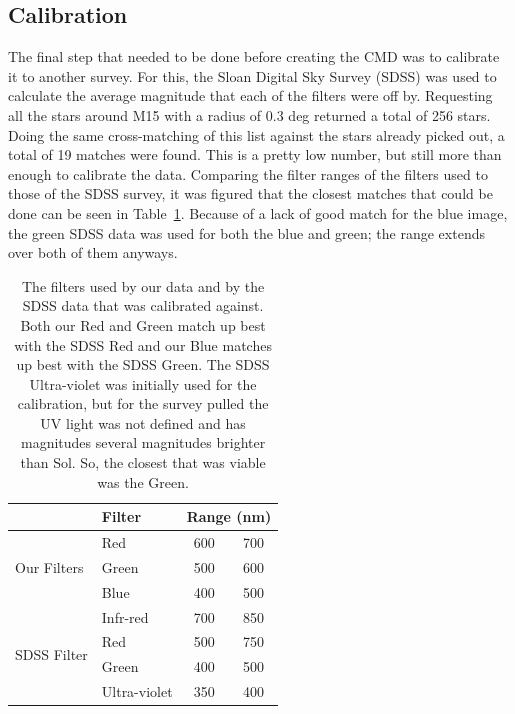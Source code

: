 \documentclass[twoside,11pt]{article}
\begin{document}
\subsection{Calibration}
The final step that needed to be done before creating the CMD was to calibrate it to another survey. For this, the Sloan Digital Sky Survey (SDSS) was used to calculate the average magnitude that each of the filters were off by. Requesting all the stars around M15 with a radius of 0.3 deg returned a total of 256 stars. Doing the same cross-matching of this list against the stars already picked out, a total of 19 matches were found. This is a pretty low number, but still more than enough to calibrate the data. Comparing the filter ranges of the filters used to those of the SDSS survey, it was figured that the closest matches that could be done can be seen in Table~\ref{tab:wavelengths}. Because of a lack of good match for the blue image, the green SDSS data was used for both the blue and green; the range extends over both of them anyways.

\begin{table}[ht]
\centering
\begin{tabular}{llcc}
                             & Filter       & \multicolumn{2}{c}{Range (nm)} \vspace{1ex}\\ \hline
\multirow{3}{*}{Our Filters} & Red          & 600            & 700           \\
                             & Green        & 500            & 600           \\
                             & Blue         & 400            & 500           \\ \hline
\multirow{4}{*}{SDSS Filter} & Infr-red     & 700            & 850           \\
                             & Red          & 500            & 750           \\
                             & Green        & 400            & 500           \\
                             & Ultra-violet & 350            & 400           \\ \hline
\end{tabular}
\caption{The filters used by our data and by the SDSS data that was calibrated against. Both our Red and Green match up best with the SDSS Red and our Blue matches up best with the SDSS Green. The SDSS Ultra-violet was initially used for the calibration, but for the survey pulled the UV light was not defined and has magnitudes several magnitudes brighter than Sol. So, the closest that was viable was the Green. \citep{filter}}
\label{tab:wavelengths}
\end{table}
\end{document}
